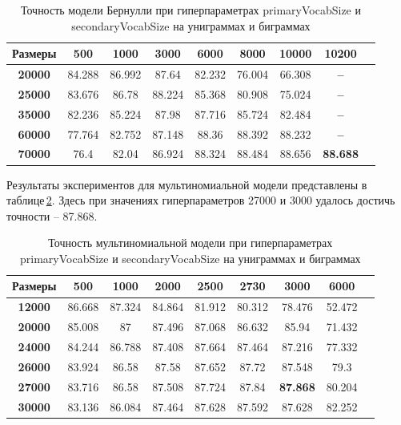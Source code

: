 \begin{table}[t]
\begin{tabular*}{\textwidth}{c @{\extracolsep{\fill}} cccccccc}
\hline {\bf Размеры} & {\bf 500} & {\bf 1000} & {\bf 3000} & {\bf 6000} & {\bf 8000} & {\bf 10000} & {\bf 10200} \\ \hline \hline
{\bf 20000} & 84.288 & 86.992 & 87.64 & 82.232 & 76.004 & 66.308 & {\bf --} \\ \hline
{\bf 25000} & 83.676 & 86.78 & 88.224 & 85.368 & 80.908 & 75.024 & {\bf --} \\ \hline
{\bf 35000} & 82.236 & 85.224 & 87.98 & 87.716 & 85.724 & 82.484 & {\bf --} \\ \hline
{\bf 60000} & 77.764 & 82.752 & 87.148	& 88.36 & 88.392 & 88.232 & {\bf --} \\ \hline
{\bf 70000} & 76.4 & 82.04 & 86.924 & 88.324 & 88.484 & 88.656 & {\bf 88.688} \\ \hline 
\end{tabular*}
\caption{{Точность модели Бернулли при гиперпараметрах primaryVocabSize и secondaryVocabSize на униграммах и биграммах}}
\label{sizes:table:naiveBayesBnb}
\end{table}

Результаты экспериментов для мультиномиальной модели представлены в таблице\,\ref{sizes:table:naiveBayesMnb}. Здесь при значениях гиперпараметров 27000 и 3000 удалось  достичь точности -- 87.868.

\begin{table}
\begin{tabular*}{\textwidth}{c @{\extracolsep{\fill}} cccccccc}
\hline {\bf Размеры} & {\bf 500} & {\bf 1000} & {\bf 2000} & {\bf 2500} & {\bf 2730} & {\bf 3000} & {\bf 6000} \\ \hline \hline
{\bf 12000} & 86.668 & 87.324 & 84.864 & 81.912 & 80.312 & 78.476 & 52.472 \\ \hline
{\bf 20000} & 85.008 & 87 & 87.496 & 87.068 & 86.632 & 85.94 & 71.432 \\ \hline
{\bf 24000} & 84.244 & 86.788 & 87.408 & 87.664 & 87.464 & 87.216 & 77.332 \\ \hline
{\bf 26000} & 83.924 & 86.58 & 87.58 & 87.652 & 87.72 & 87.548 & 79.3 \\ \hline
{\bf 27000} & 83.716 & 86.58 & 87.508 & 87.724 & 87.84 & {\bf 87.868} & 80.204 \\ \hline
{\bf 30000} & 83.136 & 86.084 & 87.464 & 87.628 & 87.592 & 87.628 & 82.252 \\ \hline
\end{tabular*}
\caption{{Точность мультиномиальной модели при гиперпараметрах primaryVocabSize и secondaryVocabSize на униграммах и биграммах}}
\label{sizes:table:naiveBayesMnb}
\end{table}

